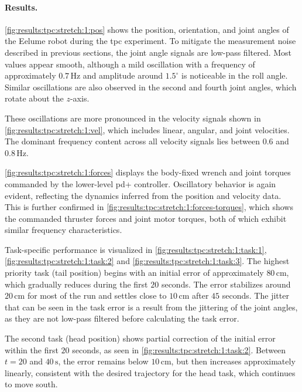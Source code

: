 \paragraph{Results.}

\autoref{fig:results:tpc:stretch:1:pos} shows the position, orientation, and joint angles of the Eelume robot during the \gls{tpc} experiment. To mitigate the measurement noise described in previous sections, the joint angle signals are low-pass filtered. Most values appear smooth, although a mild oscillation with a frequency of approximately \(0.7\,\mathrm{Hz}\) and amplitude around \(1.5^\circ\) is noticeable in the roll angle. Similar oscillations are also observed in the second and fourth joint angles, which rotate about the \(z\)-axis.

These oscillations are more pronounced in the velocity signals shown in \autoref{fig:results:tpc:stretch:1:vel}, which includes linear, angular, and joint velocities. The dominant frequency content across all velocity signals lies between \(0.6\) and \(0.8\,\mathrm{Hz}\).

\autoref{fig:results:tpc:stretch:1:forces} displays the body-fixed wrench and joint torques commanded by the lower-level \gls{pd+} controller. Oscillatory behavior is again evident, reflecting the dynamics inferred from the position and velocity data. This is further confirmed in \autoref{fig:results:tpc:stretch:1:forces-torques}, which shows the commanded thruster forces and joint motor torques, both of which exhibit similar frequency characteristics.

Task-specific performance is visualized in \autoref{fig:results:tpc:stretch:1:task:1}, \autoref{fig:results:tpc:stretch:1:task:2} and \ref{fig:results:tpc:stretch:1:task:3}. The highest priority task (tail position) begins with an initial error of approximately \(80\,\mathrm{cm}\), which gradually reduces during the first \(20\) seconds. The error stabilizes around \(20\,\mathrm{cm}\) for most of the run and settles close to \(10\,\mathrm{cm}\) after \(45\) seconds. The jitter that can be seen in the task error is a result from the jittering of the joint angles, as they are not low-pass filtered before calculating the task error.

The second task (head position) shows partial correction of the initial error within the first \(20\) seconds, as seen in \autoref{fig:results:tpc:stretch:1:task:2}. Between \(t = 20\) and \(40\,\mathrm{s}\), the error remains below \(10\,\mathrm{cm}\), but then increases approximately linearly, consistent with the desired trajectory for the head task, which continues to move south.

